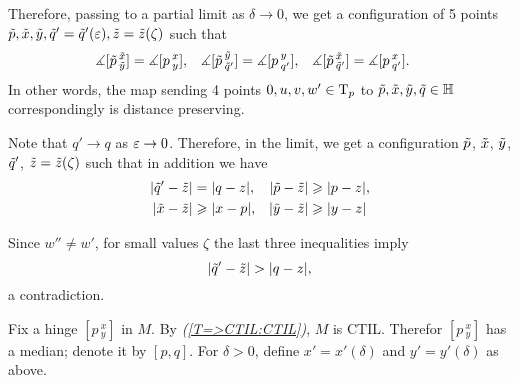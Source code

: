 Therefore, passing to a partial limit as $\delta\to0$, we get a configuration of 5 points 
$\~p, \~x,\~y,\~q'=\~q'(\eps),\~z=\~z(\zeta)$ such that  
\begin{align*}
\measuredangle[\~p\,^{\~x}_{\~y}]&= \measuredangle[p\,^{x}_{y}],
&
\measuredangle[\~p\,^{\~y}_{\~q'}]&= \measuredangle[p\,^{y}_{q'}],
&
\measuredangle[\~p\,^{\~x}_{\~q'}]&= \measuredangle[p\,^{x}_{q'}].
\end{align*}
In other words, the map sending 4 points $0,u,v,w'\in\T_p$ to $\~p,\~x,\~y,\~q\in\HH$ correspondingly is distance preserving.

Note that $q'\to q$ as $\eps\to0$. 
Therefore, in the limit,
we get a configuration $\~p$, $\~x$, $\~y$, $\~q'$, $\~z=\~z(\zeta)$ such that in addition we have
\begin{align*}
|\~q'-\~z|&=|q-z|,
&
|\~p-\~z|&\ge |p-z|,
\\
|\~x-\~z|&\ge |x-p|,
&
|\~y-\~z|&\ge |y-z|
\end{align*}

Since $w''\ne w'$, for small values $\zeta$ the last three inequalities 
imply 
\[|\~q'-\~z|>|q-z|,\]
a contradiction.





Fix a hinge $[p\,^x_y]$ in $M$.
By \textit{(\ref{T=>CTIL:CTIL})}, $M$ is CTIL.
Therefor $[p\,^x_y]$ has a median; denote it by $[p,q]$.
For $\delta>0$, define $x'=x'(\delta)$ and $y'=y'(\delta)$ as above.

\begin{comment}
\begin{wrapfigure}{r}{26 mm}
\begin{tikzpicture}[scale=1,
  thick,main node/.style={circle,draw,font=\sffamily\bfseries,minimum size=7mm}]

  \node[main node] (0) at (1/6,1/2) {$x$};
   \node[main node] (1) at (1/6,3/2) {$x'$};
  \node[main node] (2) at (1,0){$y$};
  \node[main node] (3) at (1,1){$p$};
  \node[main node] (4) at (1,2) {$y'$};
  \node[main node] (5) at (2,0) {$z$};
  \node[main node] (6) at (2,1) {$q$};

  \path[every node/.style={font=\sffamily\small}]
     (0) edge node[above]{}(3)
   (1) edge node[above]{}(3)
   (2) edge node[above]{}(3)
   (3) edge node[above]{}(6)
   (4) edge node[above]{}(3)
   (5) edge node[above]{}(6);
\end{tikzpicture}
\end{wrapfigure}
\end{comment}

